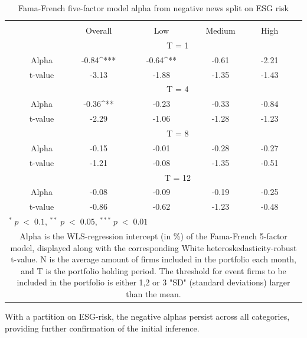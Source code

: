 \setlength{\tabcolsep}{15pt}
\begin{table}[h]
\small
\centering
\caption{Fama-French five-factor model alpha from negative news split on ESG risk} 
\begin{tabular}{ccccccc}
\hline \hline \\ 
 &     & Overall &    Low  &  Medium  &  High &  \\    \cline{3-6} 
& &  \multicolumn{4}{c}{ T = 1} & \\ \cline{2-6}
& Alpha    & -0.84^{***} & -0.64^{**}  & -0.61  & -2.21 &  \\ 
& t-value   & -3.13 & -1.88 & -1.35  & -1.43 &  \\
& &  \multicolumn{4}{c}{ T = 4} & \\ \cline{2-6}
& Alpha    & -0.36^{**} & -0.23  & -0.33  &  -0.84 & \\
& t-value &   -2.29 & -1.06 & -1.28  & -1.23 & \\
& &  \multicolumn{4}{c}{ T = 8} & \\ \cline{2-6}
& Alpha     & -0.15 & -0.01   & -0.28  & -0.27 &  \\
& t-value &   -1.21 & -0.08  & -1.35 & -0.51 &  \\
& &  \multicolumn{4}{c}{ T = 12} & \\ \cline{2-6}
& Alpha     & -0.08 & -0.09  & -0.19  & -0.25 &  \\
& t-value &    -0.86 & -0.62  & -1.23 & -0.48 &  \\
\hline \hline
 \multicolumn{7}{l}{ \footnotesize $^* \; p\; <\; 0.1$, $ ^{**} \; p\; <\; 0.05$, $ ^{***} \; p\; <\; 0.01$  } \\
 \multicolumn{7}{p{12cm}}{ \footnotesize Alpha is the WLS-regression intercept (in \%) of the Fama-French 5-factor model, displayed along with the corresponding White heteroskedasticity-robust t-value. N is the average amount of firms included in the portfolio each month, and T is the portfolio holding period. The threshold for event firms to be included in the portfolio is either 1,2 or 3 "SD" (standard deviations) larger than the mean.} \\ 
 \hline
\end{tabular}
\label{tab: FF5_neg_ESG}
\end{table}


With a partition on ESG-risk, the negative alphas persist across all categories,  providing further confirmation of the initial inference. 

